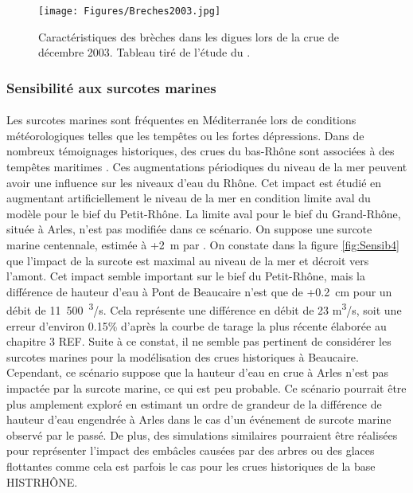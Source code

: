 \documentclass[11pt]{article}
\begin{document}
	\begin{figure}[h]
		\centering
		\texttt{[image: Figures/Breches2003.jpg]}
        \caption{Caractéristiques des brèches dans les digues lors de la crue de décembre 2003. Tableau tiré de l'étude du \citet{symadrem_programme_2012}.}
		\label{fig:Breches2003}
	\end{figure}		
	
	\subsubsection{Sensibilité aux surcotes marines}	
	
	\paragraph{} Les surcotes marines sont fréquentes en Méditerranée lors de conditions météorologiques telles que les tempêtes ou les fortes dépressions. Dans de nombreux témoignages historiques, des crues du bas-Rhône sont associées à des tempêtes maritimes \citet{pichard_sept_2014}. Ces augmentations périodiques du niveau de la mer peuvent avoir une influence sur les niveaux d'eau du Rhône. Cet impact est étudié en augmentant artificiellement le niveau de la mer en condition limite aval du modèle pour le bief du Petit-Rhône. La limite aval pour le bief du Grand-Rhône, située à Arles, n'est pas modifiée dans ce scénario. On suppose une surcote marine centennale, estimée à +2~m par \citet{kergadallan_estimation_2015}. On constate dans la figure \ref{fig:Sensib4} que l'impact de la surcote est maximal au niveau de la mer et décroit vers l'amont. Cet impact semble important sur le bief du Petit-Rhône, mais la différence de hauteur d'eau à Pont de Beaucaire n'est que de +0.2~cm pour un débit de 11~500~\textsuperscript{3}/s. Cela représente une différence en débit de 23 m\textsuperscript{3}/s, soit une erreur d'environ 0.15\% d'après la courbe de tarage la plus récente élaborée au chapitre 3 REF. Suite à ce constat, il ne semble pas pertinent de considérer les surcotes marines pour la modélisation des crues historiques à Beaucaire. Cependant, ce scénario suppose que la hauteur d'eau en crue à Arles n'est pas impactée par la surcote marine, ce qui est peu probable. Ce scénario pourrait être plus amplement exploré en estimant un ordre de grandeur de la différence de hauteur d'eau engendrée à Arles dans le cas d'un événement de surcote marine observé par le passé. De plus, des simulations similaires pourraient être réalisées pour représenter l'impact des embâcles causées par des arbres ou des glaces flottantes comme cela est parfois le cas pour les crues historiques de la base HISTRHÔNE.
	\FloatBarrier
\end{document}
